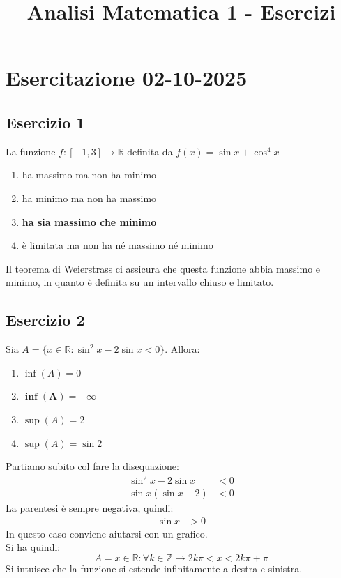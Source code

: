 \documentclass[12pt,a4paper]{article}
\title{Analisi Matematica 1 - Esercizi}
\author{}
\date{}
\let\oldsection\section
\renewcommand{\section}{\clearpage\oldsection}
\begin{document}
\maketitle
\tableofcontents

\section{Esercitazione 02-10-2025}

\subsection*{Esercizio 1}
La funzione $f : [-1,3] \rightarrow \mathbb{R}$ definita da $f(x) = \sin x + \cos^4 x$
\begin{enumerate}
  \item ha massimo ma non ha minimo
  \item ha minimo ma non ha massimo
  \item \textbf{ha sia massimo che minimo}
  \item è limitata ma non ha né massimo né minimo\\
\end{enumerate}
Il teorema di Weierstrass ci assicura che questa funzione abbia massimo e minimo, in quanto è definita su un intervallo chiuso e limitato.

\subsection*{Esercizio 2}
Sia $A = \{x \in \mathbb{R} : \sin^2 x - 2\sin x < 0\}$. Allora:
\begin{enumerate}
  \item $\inf(A) = 0$
  \item $\bm{ \inf(A) = -\infty}$
  \item $\sup(A) = 2$
  \item $\sup(A) = \sin 2$\\
\end{enumerate}
Partiamo subito col fare la disequazione:
\begin{align*}
  \sin^2 x - 2\sin x &< 0\\
  \sin x (\sin x - 2) &< 0
\end{align*}
La parentesi è sempre negativa, quindi:
\begin{align*}
  \sin x &> 0
\end{align*}
In questo caso conviene aiutarsi con un grafico.\\
Si ha quindi:
\[
A = {x \in \mathbb{R} : \forall k \in \mathbb{Z} \rightarrow 2k\pi < x < 2k\pi + \pi}
\]
Si intuisce che la funzione si estende infinitamente a destra e sinistra.
\end{document}
